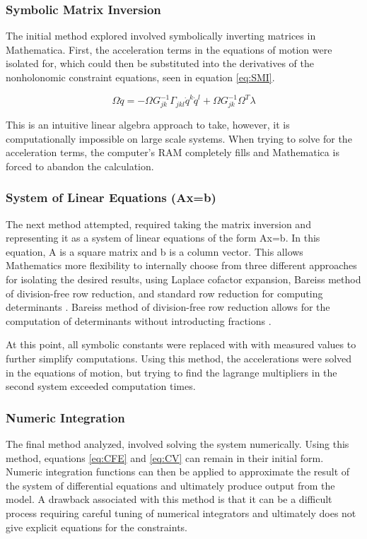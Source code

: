 \documentclass[12pt,letterpaper]{article}
\begin{document}
\subsubsection{Symbolic Matrix Inversion}
The initial method explored involved symbolically inverting matrices in Mathematica. First, the acceleration terms in the equations of motion were isolated for, which could then be substituted into the derivatives of the nonholonomic constraint equations, seen in equation \ref{eq:SMI}.

\begin{equation}
\label{eq:SMI}
\Omega \ddot{q} = -\Omega G_{jk}^{-1}\Gamma_{jkl} \dot{q}^k\dot{q}^l + \Omega G_{jk}^{-1} \Omega ^T \lambda
\end{equation}

This is an intuitive linear algebra approach to take, however, it is computationally impossible on large scale systems. When trying to solve for the acceleration terms, the computer's RAM completely fills and Mathematica is forced to abandon the calculation.

\subsubsection{System of Linear Equations (Ax=b)}
The next method attempted, required taking the matrix inversion and representing it as a system of linear equations of the form Ax=b. 
In this equation, A is a square matrix and b is a column vector.
This allows Mathematics more flexibility to internally choose from three different approaches for isolating the desired results, using Laplace cofactor expansion, Bareiss method of division-free row reduction, and standard row reduction for computing determinants \cite{linearsolve}.
 Bareiss method of division-free row reduction allows for the computation of determinants without introducting fractions \cite{bareiss}.
 \par
At this point, all symbolic constants were replaced with with measured values to further simplify computations.
Using this method, the accelerations were solved in the equations of motion, but trying to find the lagrange multipliers in the second system exceeded computation times.

\subsubsection{Numeric Integration}
The final method analyzed, involved solving the system numerically.
Using this method, equations \ref{eq:CFE} and \ref{eq:CV} can remain in their initial form.
Numeric integration functions can then be applied to approximate the result of the system of differential equations and ultimately produce output from the model.
A drawback associated with this method is that it can be a difficult process requiring careful tuning of numerical integrators and ultimately does not give explicit equations for the constraints.
\end{document}
